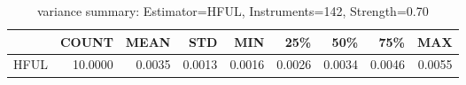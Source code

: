 \begin{table}[ht]
\centering
\caption{variance summary: Estimator=HFUL, Instruments=142, Strength=0.70}
\begin{tabular}{lrrrrrrrr}
\toprule
 & COUNT & MEAN & STD & MIN & 25\% & 50\% & 75\% & MAX \\
\midrule
HFUL & 10.0000 & 0.0035 & 0.0013 & 0.0016 & 0.0026 & 0.0034 & 0.0046 & 0.0055 \\
\bottomrule
\end{tabular}
\end{table}

